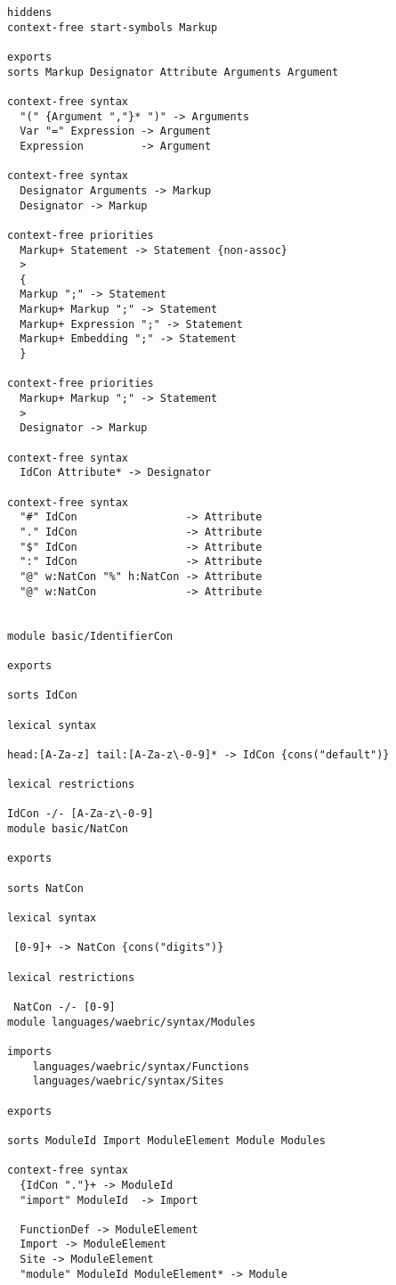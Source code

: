 \documentclass[a4paper]{article}
\begin{document}
\begin{lstlisting}[language=sdf]
hiddens
context-free start-symbols Markup

exports
sorts Markup Designator Attribute Arguments Argument

context-free syntax
  "(" {Argument ","}* ")" -> Arguments  
  Var "=" Expression -> Argument  
  Expression         -> Argument  

context-free syntax
  Designator Arguments -> Markup
  Designator -> Markup

context-free priorities
  Markup+ Statement -> Statement {non-assoc}
  >
  {
  Markup ";" -> Statement
  Markup+ Markup ";" -> Statement
  Markup+ Expression ";" -> Statement
  Markup+ Embedding ";" -> Statement
  }

context-free priorities
  Markup+ Markup ";" -> Statement
  >
  Designator -> Markup

context-free syntax
  IdCon Attribute* -> Designator  

context-free syntax
  "#" IdCon                 -> Attribute  
  "." IdCon                 -> Attribute  
  "$" IdCon                 -> Attribute  
  ":" IdCon                 -> Attribute 
  "@" w:NatCon "%" h:NatCon -> Attribute
  "@" w:NatCon              -> Attribute


module basic/IdentifierCon

exports

sorts IdCon

lexical syntax

head:[A-Za-z] tail:[A-Za-z\-0-9]* -> IdCon {cons("default")}

lexical restrictions

IdCon -/- [A-Za-z\-0-9]
module basic/NatCon

exports

sorts NatCon

lexical syntax
  
 [0-9]+ -> NatCon {cons("digits")}

lexical restrictions

 NatCon -/- [0-9]
module languages/waebric/syntax/Modules

imports 
	languages/waebric/syntax/Functions
	languages/waebric/syntax/Sites

exports

sorts ModuleId Import ModuleElement Module Modules

context-free syntax
  {IdCon "."}+ -> ModuleId
  "import" ModuleId  -> Import

  FunctionDef -> ModuleElement
  Import -> ModuleElement
  Site -> ModuleElement
  "module" ModuleId ModuleElement* -> Module
   

\end{lstlisting}
\end{document}
